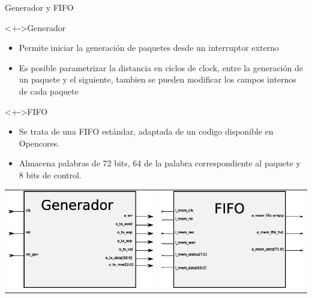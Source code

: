 \documentclass[xcolor=dvipsnames]{beamer}
\begin{document}
\begin{frame}{Generador y FIFO}
  \begin{block}<+->{Generador}
	\begin{itemize}
      \scriptsize
	\item Permite iniciar la generación de paquetes desde un interruptor externo
	\item Es posible parametrizar la distancia en ciclos de clock, entre la generación de un paquete y el siguiente, tambien se pueden modificar los campos internos de cada paquete
	   \end{itemize}
\end{block}
  \begin{block}<+->{FIFO}
	\begin{itemize}
      \scriptsize
	\item Se trata de una FIFO estándar, adaptada de un codigo disponible en Opencores.
	\item Almacena palabras de 72 bits, 64 de la palabra correspondiente al paquete y 8  bits de control.
	   \end{itemize}
\end{block}
     \center 
    \begin{tabularx}{\linewidth}{VV}
      \includegraphics[scale=0.30]{figures/bloqgenerador.eps}      
      &
      \includegraphics[scale=0.30]{figures/bloqfifo.eps}

\end{tabularx}
\end{frame}
\end{document}
